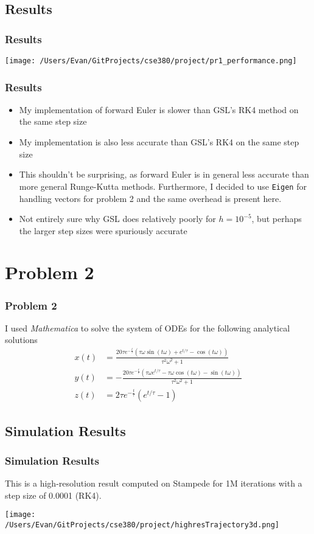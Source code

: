 \documentclass{beamer}
\begin{document}
\subsection{Results}
\begin{frame}
\frametitle{Results}
\begin{center}
\texttt{[image: /Users/Evan/GitProjects/cse380/project/pr1\_performance.png]}
\end{center}
\end{frame}

\begin{frame}
\frametitle{Results}
\begin{itemize}
\item My implementation of forward Euler is slower than GSL's RK4 method on the same step size
\item My implementation is also less accurate than GSL's RK4 on the same step size \pause
\item This shouldn't be surprising, as forward Euler is in general less accurate than more general Runge-Kutta methods. Furthermore, I decided to use \texttt{Eigen} for handling vectors for problem 2 and the same overhead is present here.
\item Not entirely sure why GSL does relatively poorly for $h=10^{-5}$, but perhaps the larger step sizes were spuriously accurate
\end{itemize}
\end{frame}

\section{Problem 2}
\begin{frame}
\frametitle{Problem 2}
I used \emph{Mathematica} to solve the system of ODEs for the following analytical solutions
\begin{align*}
x(t)&=\frac{20 \tau  e^{-\frac{t}{\tau }} \left(\tau  \omega  \sin (t \omega )+e^{t/\tau }-\cos (t \omega )\right)}{\tau ^2 \omega ^2+1}\\
y(t)&=-\frac{20 \tau  e^{-\frac{t}{\tau }} \left(\tau  \omega  e^{t/\tau }-\tau  \omega  \cos (t \omega )-\sin (t \omega )\right)}{\tau ^2 \omega ^2+1}\\
z(t)&=2 \tau  e^{-\frac{t}{\tau }} \left(e^{t/\tau }-1\right)
\end{align*}
\end{frame}

\subsection{Simulation Results}
\begin{frame}
\frametitle{Simulation Results}
This is a high-resolution result computed on Stampede for 1M iterations with a step size of 0.0001 (RK4).

\texttt{[image: /Users/Evan/GitProjects/cse380/project/highresTrajectory3d.png]}
\end{frame}
\end{document}
